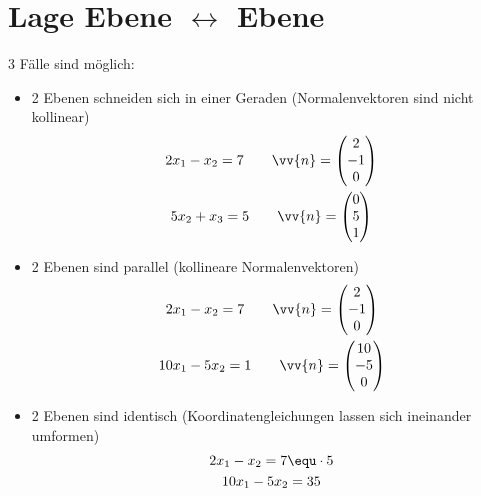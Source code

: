 \section{Lage Ebene $\leftrightarrow$ Ebene}
3 Fälle sind möglich:
\begin{itemize}
  \item 2 Ebenen schneiden sich in einer Geraden (Normalenvektoren sind nicht kollinear)
  \begin{gather*}
    2x_1 - x_2 = 7 \qquad \vv{n} = \begin{pmatrix}2 \\ -1 \\ 0\end{pmatrix} \\
    5x_2 + x_3 = 5 \qquad \vv{n} = \begin{pmatrix}0 \\ 5 \\ 1\end{pmatrix}
  \end{gather*}
  \item 2 Ebenen sind parallel (kollineare Normalenvektoren)
  \begin{gather*}
    2x_1 - x_2 = 7 \qquad \vv{n} = \begin{pmatrix}2 \\ -1 \\ 0\end{pmatrix} \\
    10x_1 - 5x_2 = 1 \qquad \vv{n} = \begin{pmatrix}10 \\ -5 \\ 0\end{pmatrix}
  \end{gather*}
  \item 2 Ebenen sind identisch (Koordinatengleichungen lassen sich ineinander umformen)
  \begin{gather*}
    2x_1 - x_2 = 7 \equ \cdot 5 \\
    10x_1 - 5x_2 = 35
  \end{gather*}
\end{itemize}
